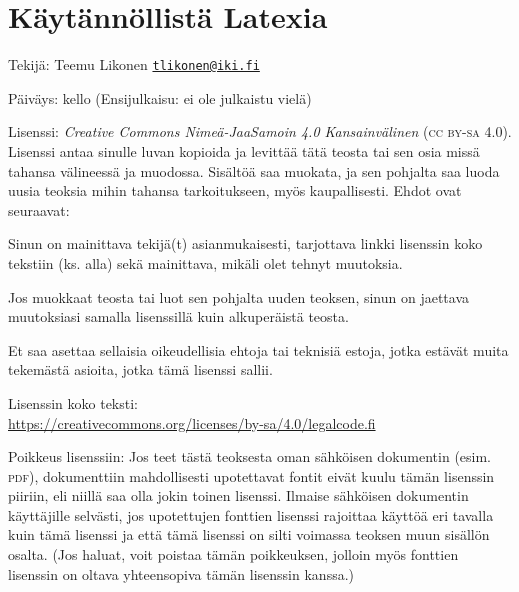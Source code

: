 \documentclass{book}
\newcommand{\kulmasp}[1]
{\href{mailto:#1}{\guilsinglleft\nolinkurl{#1}\guilsinglright}}
\begin{document}
{
  \setlength{\parindent}{0em}
  \setlength{\parskip}{1.2ex plus .1ex}

  \section*{Käytännöllistä Latexia}

  Tekijä: Teemu Likonen \kulmasp{tlikonen@iki.fi}

  Päiväys: \DTMtoday{} kello \DTMcurrenttime{} (Ensijulkaisu: ei ole
  julkaistu vielä)

  Lisenssi: \emph{Creative Commons Nimeä-Jaa\-Samoin 4.0 Kansainvälinen}
  (\textsc{cc by-sa} 4.0). Lisenssi antaa sinulle luvan kopioida ja
  levittää tätä teosta tai sen osia missä tahansa välineessä ja
  muodossa. Sisältöä saa muokata, ja sen pohjalta saa luoda uusia
  teoksia mihin tahansa tarkoitukseen, myös kaupallisesti. Ehdot ovat
  seuraavat:

  \begin{list}{\textbullet}{
      \setlength{\leftmargin}{1em}
      \setlength{\topsep}{0ex}
      \setlength{\partopsep}{0ex}
      \setlength{\itemsep}{0ex}
    }
  \item Sinun on mainittava tekijä(t) asianmukaisesti, tarjottava linkki
    lisenssin koko tekstiin (ks. alla) sekä mainittava, mikäli olet
    tehnyt muutoksia.
  \item Jos muokkaat teosta tai luot sen pohjalta uuden teoksen, sinun on
    jaettava muutoksiasi samalla lisenssillä kuin alkuperäistä teosta.
  \item Et saa asettaa sellaisia oikeudellisia ehtoja tai teknisiä
    estoja, jotka estävät muita tekemästä asioita, jotka tämä lisenssi
    sallii.
  \end{list}

  Lisenssin koko teksti: \\
  \url{https://creativecommons.org/licenses/by-sa/4.0/legalcode.fi}

  Poikkeus lisenssiin: Jos teet tästä teoksesta oman sähköisen
  dokumentin (esim. \textsc{pdf}), dokumenttiin mahdollisesti
  upotettavat fontit eivät kuulu tämän lisenssin piiriin, eli niillä saa
  olla jokin toinen lisenssi. Ilmaise sähköisen dokumentin käyttäjille
  selvästi, jos upotettujen fonttien lisenssi rajoittaa käyttöä eri
  tavalla kuin tämä lisenssi ja että tämä lisenssi on silti voimassa
  teoksen muun sisällön osalta. (Jos haluat, voit poistaa tämän
  poikkeuksen, jolloin myös fonttien lisenssin on oltava yhteensopiva
  tämän lisenssin kanssa.)

}
\end{document}
